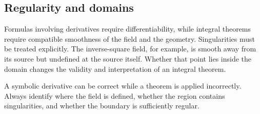 \subsection{Regularity and domains}

Formulas involving derivatives require differentiability, while integral theorems require compatible smoothness of the field and the geometry. Singularities must be treated explicitly. The inverse-square field, for example, is smooth away from its source but undefined at the source itself. Whether that point lies inside the domain changes the validity and interpretation of an integral theorem.

\begin{mistakebox}
A symbolic derivative can be correct while a theorem is applied incorrectly. Always identify where the field is defined, whether the region contains singularities, and whether the boundary is sufficiently regular.
\end{mistakebox}
